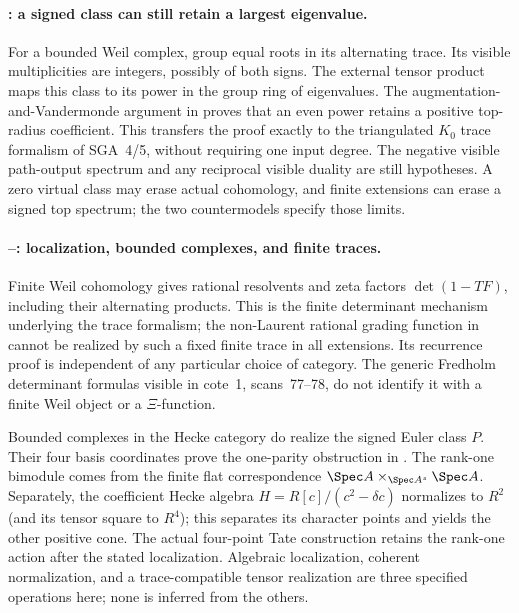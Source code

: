 \paragraph{: a signed class can still retain a largest eigenvalue.}
For a bounded Weil complex, group equal roots in its alternating trace.
Its visible multiplicities are integers, possibly of both signs.
The external tensor product maps this class to its power in the
group ring of eigenvalues. The augmentation-and-Vandermonde argument
in  proves that an even power retains a positive top-radius
coefficient. This transfers the proof exactly to the triangulated
$K_0$ trace formalism of SGA~4/5, without requiring one input degree.
The negative visible path-output spectrum and any reciprocal visible
duality are still hypotheses. A zero virtual class may erase actual
cohomology, and finite extensions can erase a signed top spectrum;
the two countermodels specify those limits.

\paragraph{--: localization, bounded complexes, and finite traces.}
Finite Weil cohomology gives rational resolvents and zeta factors
$\det(1-TF)$, including their alternating products. This is the
finite determinant mechanism underlying the trace formalism; the
non-Laurent rational grading function in  cannot be realized
by such a fixed finite trace in all extensions. Its recurrence proof
is independent of any particular choice of category. The generic
Fredholm determinant formulas visible in cote~1, scans~77--78,
do not identify it with a finite Weil object or a $\Xi$-function.

Bounded complexes in the Hecke category do realize the signed Euler
class $P$. Their four basis coordinates prove the one-parity
obstruction in . The rank-one bimodule comes from the
finite flat correspondence
$\Spec A\times_{\Spec A^s}\Spec A$. Separately, the coefficient
Hecke algebra $H=R[c]/(c^2-\delta c)$ normalizes to $R^2$
(and its tensor square to $R^4$); this separates its character
points and yields the other positive cone.
The actual four-point Tate construction retains the rank-one action
after the stated localization. Algebraic localization, coherent
normalization, and a trace-compatible tensor realization are three
specified operations here; none is inferred from the others.


